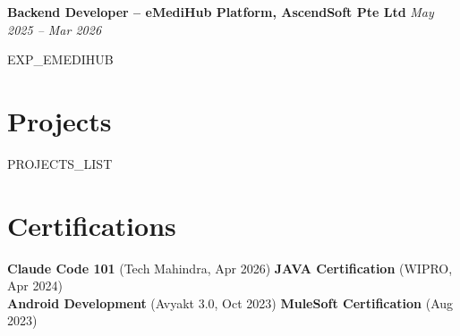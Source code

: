 \documentclass[10pt]{article}
\begin{document}
\vspace{0.2em}
\textbf{Backend Developer – eMediHub Platform, AscendSoft Pte Ltd} \hfill \textit{May 2025 – Mar 2026}
\begin{itemize}
{{EXP_EMEDIHUB}}
\end{itemize}
\vspace{0.5em}

\section*{Projects}
\begin{itemize}
{{PROJECTS_LIST}}
\end{itemize}
\vspace{0.5em}

\section*{Certifications}
\noindent
\textbf{Claude Code 101} (Tech Mahindra, Apr 2026) \hfill \textbf{JAVA Certification} (WIPRO, Apr 2024) \\[0.4em]
\textbf{Android Development} (Avyakt 3.0, Oct 2023) \hfill \textbf{MuleSoft Certification} (Aug 2023)
\end{document}
